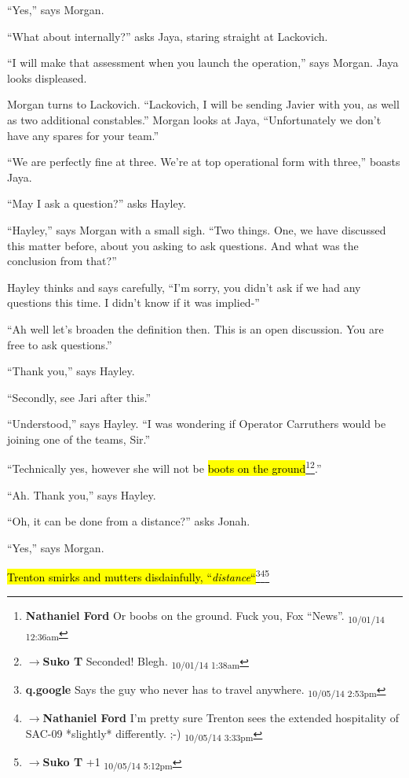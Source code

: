 ``Yes,'' says Morgan.

``What about internally?'' asks Jaya, staring straight at Lackovich.

``I will make that assessment when you launch the operation,'' says Morgan.  Jaya looks displeased.

Morgan turns to Lackovich.  ``Lackovich, I will be sending Javier with you, as well as two additional constables.''  Morgan looks at Jaya, ``Unfortunately we don't have any spares for your team.''

``We are perfectly fine at three. We're at top operational form with three,'' boasts Jaya.

``May I ask a question?'' asks Hayley.

``Hayley,'' says Morgan with a small sigh.  ``Two things.  One, we have discussed this matter before, about you asking to ask questions.  And what was the conclusion from that?''

Hayley thinks and says carefully, ``I'm sorry, you didn't ask if we had any questions this time.  I didn't know if it was implied-''

``Ah well let's broaden the definition then. This is an open discussion.  You are free to ask questions.''

``Thank you,'' says Hayley.

``Secondly, see Jari after this.''

``Understood,'' says Hayley.  ``I was wondering if Operator Carruthers would be joining one of the teams, Sir.''

``Technically yes, however she will not be \hl{boots on the ground}\footnote{\textbf{Nathaniel Ford }Or boobs on the ground. Fuck you, Fox ``News''. \textsubscript{10/01/14 12:36am}}\footnote{$\rightarrow$\textbf{Suko T }Seconded!  Blegh. \textsubscript{10/01/14 1:38am}}.''

``Ah.  Thank you,'' says Hayley.

``Oh, it can be done from a distance?'' asks Jonah.

``Yes,'' says Morgan.  

\hl{Trenton smirks and mutters disdainfully, ``\textit{distance}``}\footnote{\textbf{q.google }Says the guy who never has to travel anywhere. \textsubscript{10/05/14 2:53pm}}\footnote{$\rightarrow$\textbf{Nathaniel Ford }I'm pretty sure Trenton sees the extended hospitality of SAC-09 *slightly* differently. ;-) \textsubscript{10/05/14 3:33pm}}\footnote{$\rightarrow$\textbf{Suko T }+1 \textsubscript{10/05/14 5:12pm}}


